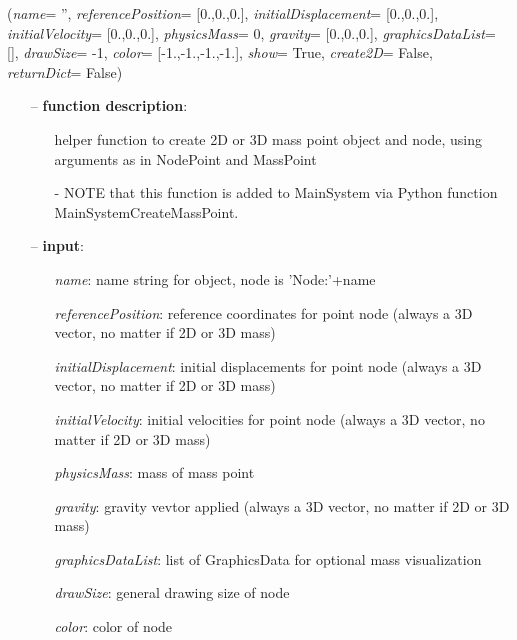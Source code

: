 %
\begin{flushleft}
\label{sec:mainsystemextensions:CreateMassPoint}
({\it name}= '', {\it referencePosition}= [0.,0.,0.], {\it initialDisplacement}= [0.,0.,0.], {\it initialVelocity}= [0.,0.,0.], {\it physicsMass}= 0, {\it gravity}= [0.,0.,0.], {\it graphicsDataList}= [], {\it drawSize}= -1, {\it color}= [-1.,-1.,-1.,-1.], {\it show}= True, {\it create2D}= False, {\it returnDict}= False)
\end{flushleft}
\setlength{\itemindent}{0.7cm}
\begin{itemize}[leftmargin=0.7cm]
\item[--]
{\bf function description}: \vspace{-6pt}
\begin{itemize}[leftmargin=1.2cm]
\setlength{\itemindent}{-0.7cm}
\item[]helper function to create 2D or 3D mass point object and node, using arguments as in NodePoint and MassPoint
\item[]- NOTE that this function is added to MainSystem via Python function MainSystemCreateMassPoint.
\end{itemize}
\item[--]
{\bf input}: \vspace{-6pt}
\begin{itemize}[leftmargin=1.2cm]
\setlength{\itemindent}{-0.7cm}
\item[]{\it name}: name string for object, node is 'Node:'+name
\item[]{\it referencePosition}: reference coordinates for point node (always a 3D vector, no matter if 2D or 3D mass)
\item[]{\it initialDisplacement}: initial displacements for point node (always a 3D vector, no matter if 2D or 3D mass)
\item[]{\it initialVelocity}: initial velocities for point node (always a 3D vector, no matter if 2D or 3D mass)
\item[]{\it physicsMass}: mass of mass point
\item[]{\it gravity}: gravity vevtor applied (always a 3D vector, no matter if 2D or 3D mass)
\item[]{\it graphicsDataList}: list of GraphicsData for optional mass visualization
\item[]{\it drawSize}: general drawing size of node
\item[]{\it color}: color of node

\end{itemize}
\end{itemize}
